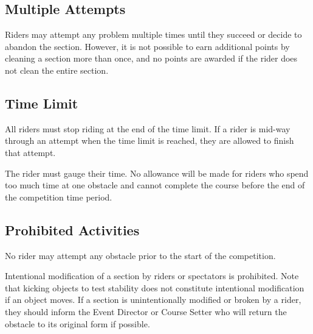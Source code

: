 \subsection{Multiple Attempts}
Riders may attempt any problem multiple times until they succeed or decide to abandon the section.
However, it is not possible to earn additional points by cleaning a section more than once, and no points are awarded if the rider does not clean the entire section.

\subsection{Time Limit}

All riders must stop riding at the end of the time limit.
If a rider is mid-way through an attempt when the time limit is reached, they are allowed to finish that attempt.

The rider must gauge their time.
No allowance will be made for riders who spend too much time at one obstacle and cannot complete the course before the end of the competition time period.

\subsection{Prohibited Activities}
No rider may attempt any obstacle prior to the start of the competition.

Intentional modification of a section by riders or spectators is prohibited.
Note that kicking objects to test stability does not constitute intentional modification if an object moves.
If a section is unintentionally modified or broken by a rider, they should inform the Event Director or Course Setter who will return the obstacle to its original form if possible.%
